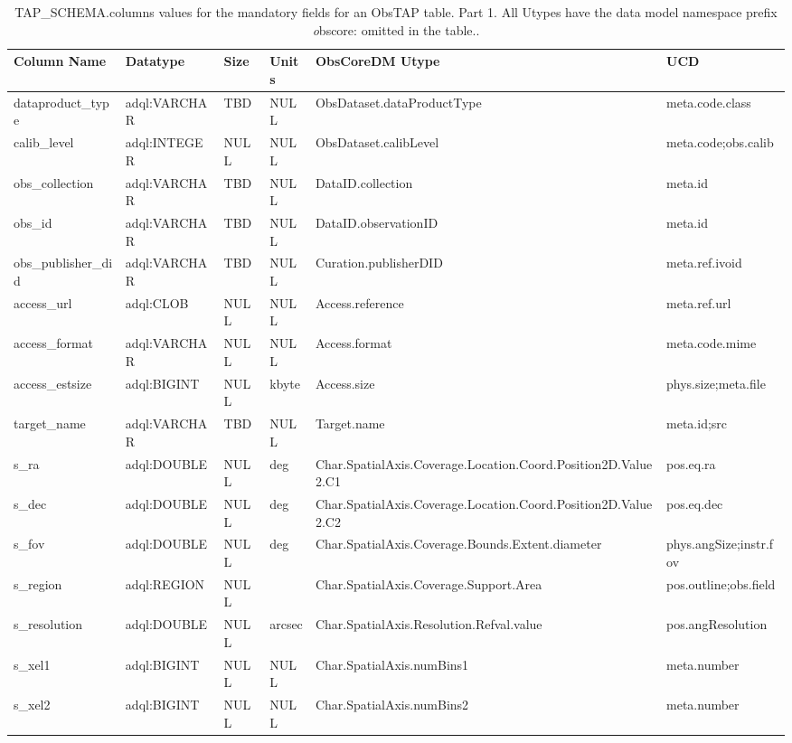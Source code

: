 \documentclass[11pt,a4paper]{ivoa}
\begin{document}
\begin{table}
\small
\begin{tabular}{|l|l|l|l|l|l|}%
\hline
Column Name & Datatype & Size & Units & ObsCoreDM Utype & UCD \\\hline
dataproduct\_type &
adql:VARCHAR &
TBD &
NULL &
ObsDataset.dataProductType &
meta.code.class
\\\hline
calib\_level &
adql:INTEGER &
NULL &
NULL &
ObsDataset.calibLevel &
meta.code;obs.calib
\\\hline
obs\_collection &
adql:VARCHAR &
TBD &
NULL &
DataID.collection &
meta.id
\\\hline
obs\_id &
adql:VARCHAR &
TBD &
NULL &
DataID.observationID &
meta.id
\\\hline
obs\_publisher\_did &
adql:VARCHAR &
TBD &
NULL &
Curation.publisherDID &
meta.ref.ivoid
\\\hline
access\_url &
adql:CLOB &
NULL &
NULL &
Access.reference &
meta.ref.url
\\\hline
access\_format &
adql:VARCHAR &
NULL &
NULL &
Access.format &
meta.code.mime
\\\hline
access\_estsize &
adql:BIGINT &
NULL &
kbyte &
Access.size &
phys.size;meta.file
\\\hline
target\_name &
adql:VARCHAR &
TBD &
NULL &
Target.name &
meta.id;src
\\\hline
s\_ra &
adql:DOUBLE &
NULL &
deg &
Char.SpatialAxis.Coverage.Location.Coord.Position2D.Value2.C1 &
pos.eq.ra
\\\hline
s\_dec &
adql:DOUBLE &
NULL &
deg &
Char.SpatialAxis.Coverage.Location.Coord.Position2D.Value2.C2 &
pos.eq.dec
\\\hline
s\_fov &
adql:DOUBLE &
NULL &
deg &
Char.SpatialAxis.Coverage.Bounds.Extent.diameter &
phys.angSize;instr.fov
\\\hline
s\_region &
adql:REGION &
NULL &
 &
Char.SpatialAxis.Coverage.Support.Area &
pos.outline;obs.field
\\\hline
s\_resolution &
adql:DOUBLE &
NULL &
arcsec &
Char.SpatialAxis.Resolution.Refval.value &
pos.angResolution
\\\hline
s\_xel1 &
adql:BIGINT &
NULL &
NULL &
Char.SpatialAxis.numBins1 &
meta.number
\\\hline
s\_xel2 &
adql:BIGINT &
NULL &
NULL &
Char.SpatialAxis.numBins2 &
meta.number
\\\hline
\end{tabular}
\caption{TAP\_SCHEMA.columns values for the mandatory fields for an ObsTAP table. Part 1. All Utypes have the data model namespace prefix {\emph obscore:} omitted in the table..}
\label{table:tapschema-mandatory1}
\end{table}
\end{document}
